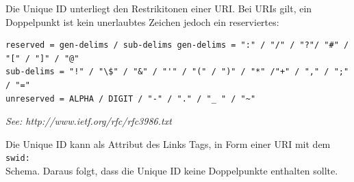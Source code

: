 Die Unique ID unterliegt den Restrikitonen einer URI. Bei URIs gilt, ein
Doppelpunkt ist kein unerlaubtes Zeichen jedoch ein reserviertes:

\begin{verbatim} 
reserved = gen-delims / sub-delims gen-delims = ":" / "/" / "?"/ "#" / "[" / "]" / "@" 
sub-delims = "!" / "\$" / "&" / "'" / "(" / ")" / "*" /"+" / "," / ";" / "=" 
unreserved = ALPHA / DIGIT / "-" / "." / "_ " / "~"
\end{verbatim}

\textit{See: http://www.ietf.org/rfc/rfc3986.txt}

Die Unique ID kann als Attribut des Links Tags, in Form einer URI mit dem
\texttt{swid:\\} Schema. Daraus folgt, dass die Unique ID keine Doppelpunkte
enthalten sollte.
